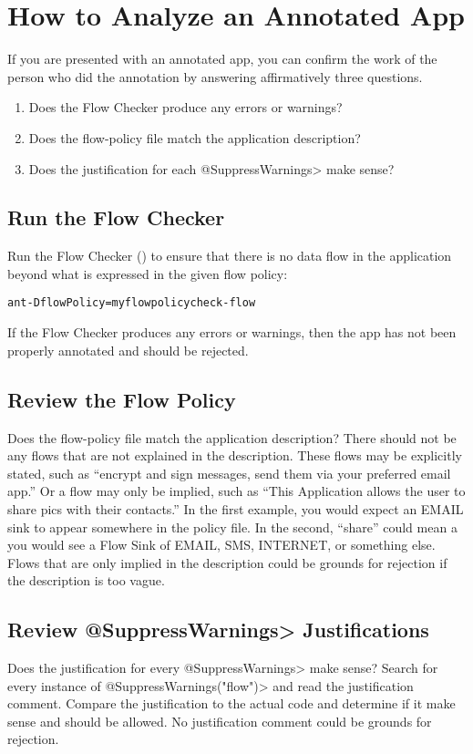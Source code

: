 \htmlhr
\chapter{How to Analyze an Annotated App\label{analyze-annotated-app}}

If you are presented with an annotated app, you can confirm the work of the
person who did the annotation by answering affirmatively three questions.

\begin{enumerate}
\item Does the Flow Checker produce any errors or warnings?
\item Does the flow-policy file match the application description?
\item Does the justification for each \<@SuppressWarnings> make sense?
\end{enumerate}

\section{Run the Flow Checker}

Run the Flow Checker () to ensure that there is no
data flow in the application beyond what is expressed in the given flow
policy:

\begin{alltt}
ant -DflowPolicy=myflowpolicy check-flow
\end{alltt}

If the Flow Checker produces any errors or warnings, then the app has not
been properly annotated and should be rejected.

\section{Review the Flow Policy}
Does the flow-policy file match the application description? There should
not be any flows that are not explained in the description.  These flows
may be explicitly stated, such as ``encrypt and sign messages, send them
via your preferred email app.''  Or a flow may only be implied, such as
``This Application allows the user to share pics with their contacts.''  In
the first example, you would expect an EMAIL sink to appear somewhere in
the policy file. In the second, ``share'' could mean a you would see a Flow
Sink of EMAIL, SMS, INTERNET, or something else.  Flows that are only
implied in the description could be grounds for rejection if the
description is too vague.

\section{Review \<@SuppressWarnings> Justifications}
Does the justification for every \<@SuppressWarnings> make sense? Search
for every instance of \<@SuppressWarnings("flow")> and read the
justification comment.  Compare the justification to the actual code and
determine if it make sense and should be allowed.  No justification comment
could be grounds for rejection.
  

